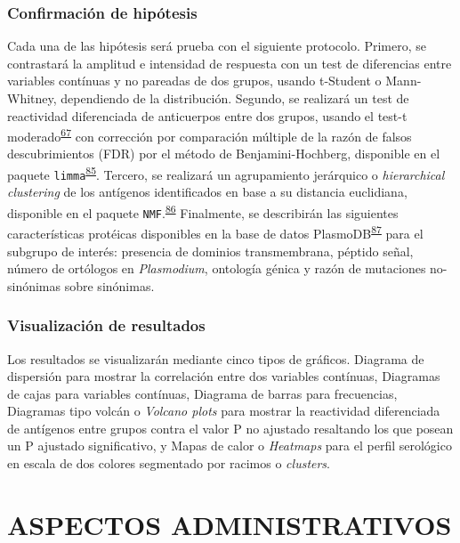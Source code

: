 \documentclass[]{article}
\begin{document}
\subsubsection{Confirmación de
hipótesis}\label{confirmacion-de-hipotesis}

Cada una de las hipótesis será prueba con el siguiente protocolo.
Primero, se contrastará la amplitud e intensidad de respuesta con un
test de diferencias entre variables contínuas y no pareadas de dos
grupos, usando t-Student o Mann-Whitney, dependiendo de la distribución.
Segundo, se realizará un test de reactividad diferenciada de anticuerpos
entre dos grupos, usando el test-t
moderado\textsuperscript{\protect\hyperlink{ref-smyth2004ebayes}{67}}
con corrección por comparación múltiple de la razón de falsos
descubrimientos (FDR) por el método de Benjamini-Hochberg, disponible en
el paquete
\texttt{limma}\textsuperscript{\protect\hyperlink{ref-limma}{85}}.
Tercero, se realizará un agrupamiento jerárquico o \emph{hierarchical
clustering} de los antígenos identificados en base a su distancia
euclidiana, disponible en el paquete
\texttt{NMF}.\textsuperscript{\protect\hyperlink{ref-Gaujoux2010NMF}{86}}
Finalmente, se describirán las siguientes características protéicas
disponibles en la base de datos
PlasmoDB\textsuperscript{\protect\hyperlink{ref-plasmodb}{87}} para el
subgrupo de interés: presencia de dominios transmembrana, péptido señal,
número de ortólogos en \emph{Plasmodium}, ontología génica y razón de
mutaciones no-sinónimas sobre sinónimas.

\subsubsection{Visualización de
resultados}\label{visualizacion-de-resultados}

Los resultados se visualizarán mediante cinco tipos de gráficos.
Diagrama de dispersión para mostrar la correlación entre dos variables
contínuas, Diagramas de cajas para variables contínuas, Diagrama de
barras para frecuencias, Diagramas tipo volcán o \emph{Volcano plots}
para mostrar la reactividad diferenciada de antígenos entre grupos
contra el valor P no ajustado resaltando los que posean un P ajustado
significativo, y Mapas de calor o \emph{Heatmaps} para el perfil
serológico en escala de dos colores segmentado por racimos o
\emph{clusters}.

\section{ASPECTOS ADMINISTRATIVOS}\label{aspectos-administrativos}
\end{document}
